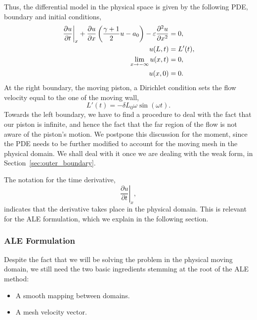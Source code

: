\documentclass[../../thesis.tex]{subfiles}
\begin{document}
Thus, the differential model in the physical space is given by the following PDE, boundary and initial conditions,
\begin{subequations}
    \begin{align}
        \left.\frac{\partial u}{\partial t}\right|_{x} 
        + \frac{\partial u}{\partial x}\left(\frac{\gamma+1}{2}u - a_0\right) 
        - \varepsilon \pdv[2]{u}{x} &= 0, \label{eq:1d_fom_strong_pde} \\
        u(L, t) &= L'(t),
        \\
        \lim_{x\rightarrow-\infty}u(x,t) &= 0,
        \label{eq:rest_condition_at_infinity}
        \\
        u(x, 0) &= 0. 
    \end{align}
\end{subequations}
At the right boundary, the moving piston, a Dirichlet condition sets the flow velocity equal to the one of the moving wall,
\begin{equation}
    L'(t) = - \delta L_0 \omega \sin(\omega t).
\end{equation}
Towards the left boundary, we have to find a procedure to deal with the fact that our piston is infinite, and hence the fact that the far region of the flow is not aware of the piston's motion. 
We postpone this discussion for the moment,
since the PDE needs to be further modified to account for the 
moving mesh in the physical domain.
We shall deal with it once we are dealing with the weak form,
in Section~\ref{sec:outer_boundary}.

The notation for the time derivative,
\begin{equation*}
    \left.\frac{\partial u}{\partial t}\right|_{x},
\end{equation*}
indicates that the derivative takes place in the physical domain. 
This is relevant for the ALE formulation, which we explain in the following section.

\subsubsection{ALE Formulation}
Despite the fact that we will be solving the problem in the physical moving domain, 
we still need the two basic ingredients stemming at the root of the ALE method:
\begin{itemize}
    \item A smooth mapping between domains.
    \item A mesh velocity vector.
\end{itemize}
\end{document}
